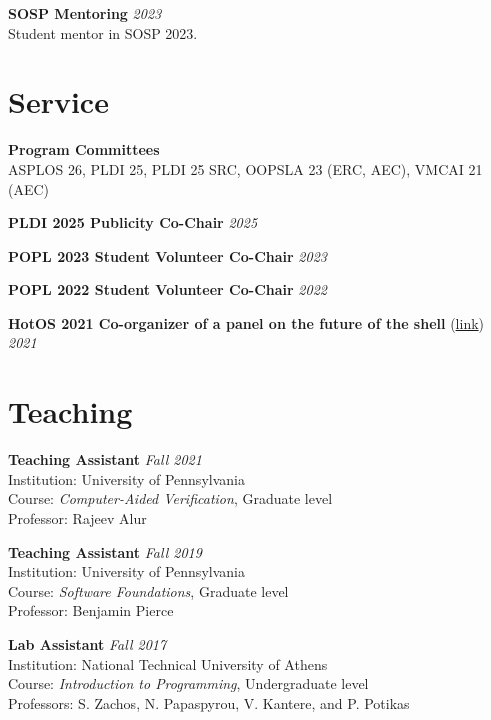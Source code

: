 \documentclass[margin]{res}
\begin{document}
\begin{resume}
\textbf{SOSP Mentoring}  \hfill {\em 2023} \\
Student mentor in SOSP 2023.

\section{Service}
\hypertarget{sec:service}{}

\textbf{Program Committees} \\ %
ASPLOS 26, PLDI 25, PLDI 25 SRC, OOPSLA 23 (ERC, AEC), VMCAI 21 (AEC)


\textbf{PLDI 2025 Publicity Co-Chair}  \hfill {\em 2025}

\textbf{POPL 2023 Student Volunteer Co-Chair}  \hfill {\em 2023}


\textbf{POPL 2022 Student Volunteer Co-Chair}  \hfill {\em 2022}

\textbf{HotOS 2021 Co-organizer of a panel on the future of the shell} (\href{https://fut-shell.github.io/}{link})  \hfill {\em 2021}



\section{Teaching}
\hypertarget{sec:teaching}{}

\textbf{Teaching Assistant}  \hfill {\em Fall 2021} \\
Institution: University of Pennsylvania \\
Course: \textit{Computer-Aided Verification}, Graduate level \\
Professor: Rajeev Alur

\textbf{Teaching Assistant}  \hfill {\em Fall 2019} \\
Institution: University of Pennsylvania \\
Course: \textit{Software Foundations}, Graduate level \\
Professor: Benjamin Pierce

\textbf{Lab Assistant}  \hfill {\em Fall 2017} \\
Institution: National Technical University of Athens \\
Course: \textit{Introduction to Programming}, Undergraduate level \\
Professors: S. Zachos, N. Papaspyrou, V. Kantere, and P. Potikas



\end{resume}
\end{document}
